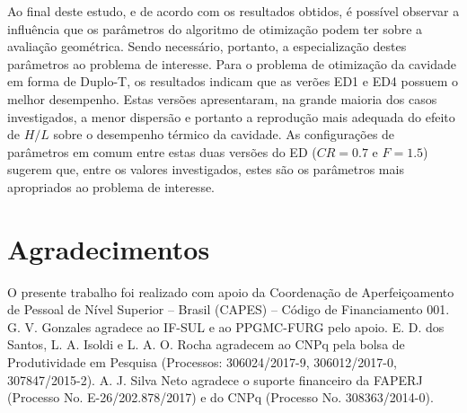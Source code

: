 \documentclass[12pt,A4,A4pt]{article}
\begin{document}
Ao final deste estudo, e de acordo com os resultados obtidos, é possível observar a influência que os parâmetros do algoritmo de otimização podem ter sobre a avaliação geométrica. Sendo necessário, portanto, a especialização destes parâmetros ao problema de interesse. Para o problema de otimização da cavidade em forma de Duplo-T, os resultados indicam que as verões ED1 e ED4 possuem o melhor desempenho. Estas versões apresentaram, na grande maioria dos casos investigados, a menor dispersão e portanto a reprodução mais adequada do efeito de $H/L$ sobre o desempenho térmico da cavidade. As configurações de parâmetros em comum entre estas duas versões do ED ($CR=0.7$ e $F=1.5$) sugerem que, entre os valores investigados, estes são os parâmetros mais apropriados ao problema de interesse.

\section*{Agradecimentos}
\hspace{0.5cm}O presente trabalho foi realizado com apoio da Coordenação de Aperfeiçoamento
de Pessoal de Nível Superior – Brasil (CAPES) – Código de Financiamento 001. G. V. Gonzales agradece ao IF-SUL e ao  PPGMC-FURG pelo apoio.  E. D. dos Santos, L. A. Isoldi e L. A. O. Rocha agradecem ao CNPq pela bolsa de Produtividade em Pesquisa (Processos: 306024/2017-9, 306012/2017-0, 307847/2015-2). A. J. Silva Neto agradece o suporte financeiro da FAPERJ (Processo No. E-26/202.878/2017) e do CNPq (Processo No. 308363/2014-0). 

%


\end{document}
